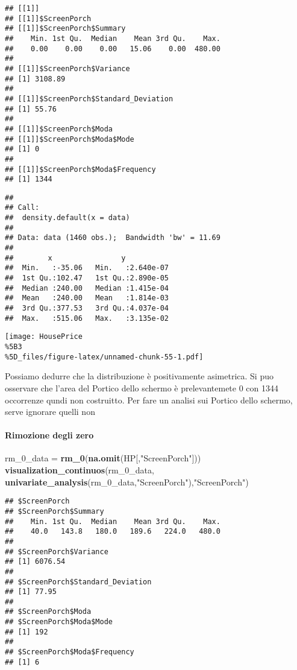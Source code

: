 \documentclass[
]{article}
\newenvironment{Shaded}{\begin{snugshade}}{\end{snugshade}}
\newcommand{\FunctionTok}[1]{\textcolor[rgb]{0.13,0.29,0.53}{\textbf{#1}}}
\newcommand{\NormalTok}[1]{#1}
\newcommand{\OtherTok}[1]{\textcolor[rgb]{0.56,0.35,0.01}{#1}}
\newcommand{\StringTok}[1]{\textcolor[rgb]{0.31,0.60,0.02}{#1}}
\begin{document}
\begin{verbatim}
## [[1]]
## [[1]]$ScreenPorch
## [[1]]$ScreenPorch$Summary
##    Min. 1st Qu.  Median    Mean 3rd Qu.    Max. 
##    0.00    0.00    0.00   15.06    0.00  480.00 
## 
## [[1]]$ScreenPorch$Variance
## [1] 3108.89
## 
## [[1]]$ScreenPorch$Standard_Deviation
## [1] 55.76
## 
## [[1]]$ScreenPorch$Moda
## [[1]]$ScreenPorch$Moda$Mode
## [1] 0
## 
## [[1]]$ScreenPorch$Moda$Frequency
## [1] 1344
\end{verbatim}

\begin{verbatim}
## 
## Call:
##  density.default(x = data)
## 
## Data: data (1460 obs.);  Bandwidth 'bw' = 11.69
## 
##        x                y            
##  Min.   :-35.06   Min.   :2.640e-07  
##  1st Qu.:102.47   1st Qu.:2.890e-05  
##  Median :240.00   Median :1.415e-04  
##  Mean   :240.00   Mean   :1.814e-03  
##  3rd Qu.:377.53   3rd Qu.:4.037e-04  
##  Max.   :515.06   Max.   :3.135e-02
\end{verbatim}

\texttt{[image: HousePrice\\\%5B3\\\%5D\_files/figure-latex/unnamed-chunk-55-1.pdf]}

Possiamo dedurre che la distribuzione è positivamente asimetrica. Si puo
osservare che l'area del Portico dello schermo è prelevantemete 0 con
1344 occorrenze qundi non costruitto. Per fare un analisi sui Portico
dello schermo, serve ignorare quelli non

\paragraph{Rimozione degli zero}\label{rimozione-degli-zero-12}

\begin{Shaded}
\begin{Highlighting}[]
\NormalTok{rm\_0\_data }\OtherTok{=} \FunctionTok{rm\_0}\NormalTok{(}\FunctionTok{na.omit}\NormalTok{(HP[,}\StringTok{"ScreenPorch"}\NormalTok{]))}
\FunctionTok{visualization\_continuos}\NormalTok{(rm\_0\_data, }\FunctionTok{univariate\_analysis}\NormalTok{(rm\_0\_data,}\StringTok{"ScreenPorch"}\NormalTok{),}\StringTok{"ScreenPorch"}\NormalTok{)}
\end{Highlighting}
\end{Shaded}

\begin{verbatim}
## $ScreenPorch
## $ScreenPorch$Summary
##    Min. 1st Qu.  Median    Mean 3rd Qu.    Max. 
##    40.0   143.8   180.0   189.6   224.0   480.0 
## 
## $ScreenPorch$Variance
## [1] 6076.54
## 
## $ScreenPorch$Standard_Deviation
## [1] 77.95
## 
## $ScreenPorch$Moda
## $ScreenPorch$Moda$Mode
## [1] 192
## 
## $ScreenPorch$Moda$Frequency
## [1] 6
\end{verbatim}
\end{document}
